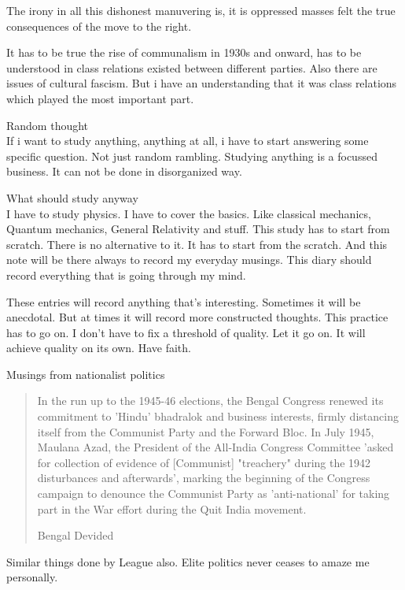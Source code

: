 \documentclass[14pt]{extarticle}
\begin{document}
The irony in all this dishonest manuvering is, it is oppressed masses felt the
true consequences of the move to the right.

It has to be true the rise of communalism in 1930s and onward, has to be
understood in class relations existed between different parties. Also there are
issues of cultural fascism. But i have an understanding that it was class
relations which played the most important part.\par

{\Large Random thought }\\[3mm]

If i want to study anything, anything at all, i have to start answering
some specific question. Not just random rambling. Studying anything is
a focussed business. It can not be done in disorganized way. \par


{\Large What should study anyway} \\[3mm] 

I have to study physics. I have to cover the basics. Like classical
mechanics, Quantum mechanics, General Relativity and stuff. This study has
to start from scratch. There is no alternative to it. It has to start from
the scratch. And this note will be there always to record my everyday
musings. This diary should record everything that is going through my
mind.\par

These entries will record anything that's interesting. Sometimes it will
be anecdotal. But at times it will record more constructed thoughts. This
practice has to go on. I don't have to fix a threshold of quality. Let it
go on. It will achieve quality on its own. Have faith. \par
\vspace{2cm}
{\Large Musings from nationalist politics} \\ [3mm]

\blockquote[Bengal Devided]{\small In the run up to the 1945-46 elections, the Bengal
Congress renewed its commitment to 'Hindu' bhadralok and business
interests, firmly distancing itself from the Communist Party and the
Forward Bloc. In July 1945, Maulana Azad, the President of the All-India
Congress Committee 'asked for collection of evidence of [Communist]
"treachery" during the 1942 disturbances and afterwards', marking the
beginning of the Congress campaign to denounce the Communist Party as
'anti-national' for taking part in the War effort during the Quit India
movement.}

Similar things done by League also. Elite politics never ceases to amaze
me personally.
\end{document}
